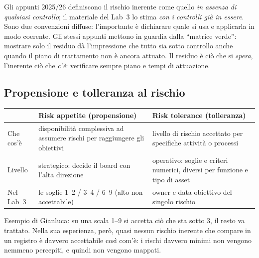 \begin{nota}
Gli appunti 2025/26 definiscono il rischio inerente come quello \emph{in assenza di qualsiasi controllo}; il
materiale del Lab~3 lo stima \emph{con i controlli già in essere}. Sono due convenzioni diffuse: l'importante
è dichiarare quale si usa e applicarla in modo coerente. Gli stessi appunti mettono in guardia dalla
``matrice verde'': mostrare solo il residuo dà l'impressione che tutto sia sotto controllo anche quando il
piano di trattamento non è ancora attuato. Il residuo è ciò che si \emph{spera}, l'inerente ciò che
\emph{c'è}: verificare sempre piano e tempi di attuazione.
\end{nota}

\subsection{Propensione e tolleranza al rischio}
\begin{center}
\small
\begin{tabularx}{\linewidth}{>{\raggedright\arraybackslash}p{2.4cm} X X}
\toprule
 & \textbf{Risk appetite (propensione)} & \textbf{Risk tolerance (tolleranza)}\\
\midrule
Che cos'è & disponibilità complessiva ad assumere rischi per raggiungere gli obiettivi & livello di rischio
  accettato per specifiche attività o processi\\
Livello & strategico: decide il board con l'alta direzione & operativo: soglie e criteri numerici, diversi
  per funzione e tipo di asset\\
Nel Lab~3 & le soglie 1--2 / 3--4 / 6--9 (alto non accettabile) & owner e data obiettivo del singolo
  rischio\\
\bottomrule
\end{tabularx}
\end{center}
Esempio di Gianluca: su una scala 1--9 si accetta ciò che sta sotto 3, il resto va trattato. Nella sua
esperienza, però, quasi nessun rischio inerente che compare in un registro è davvero accettabile così com'è:
i rischi davvero minimi non vengono nemmeno percepiti, e quindi non vengono mappati.

